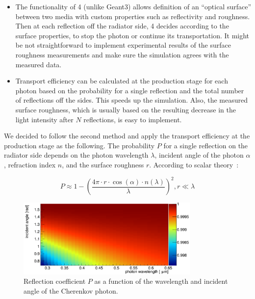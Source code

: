 \begin{itemize}
\item The functionality of {\geant}4 (unlike Geant3) allows definition of an ``optical surface'' between two media with custom properties such as reflectivity and roughness. Then at each reflection off the radiator side, {\geant}4 decides according to the surface properties, to stop the photon or continue its transportation. It might be not straightforward to implement experimental results of the surface roughness measurements and make sure the simulation agrees with the measured data.
\item Transport efficiency can be calculated at the production stage for each photon based on the probability for a single reflection and the total number of reflections off the sides. This speeds up the simulation. Also, the measured surface roughness, which is usually based on the resulting decrease in the light intensity after $N$ reflections, is easy to implement.
\end{itemize}

We decided to follow the second method and apply the transport efficiency at the production stage as the following. The probability $P$ for a single reflection on the radiator side depends on the photon wavelength $\lambda$, incident angle of the photon $\alpha$, refraction index $n$, and the surface roughness $r$. According to scalar theory~\cite{scalar}:

\begin{equation}
P \approx  1 - \left( \frac{4\pi \cdot r \cdot \cos(\alpha) \cdot n(\lambda)}{\lambda} \right)^{2}, r \ll \lambda
\end{equation}

\begin{figure}[!h]
\centering
\includegraphics[width=0.8\textwidth]{pics/psurf.png}
\caption{\label{pic:sur}
Reflection coefficient $P$ as a function of the wavelength and incident angle of the Cherenkov photon.
}
\end{figure}

